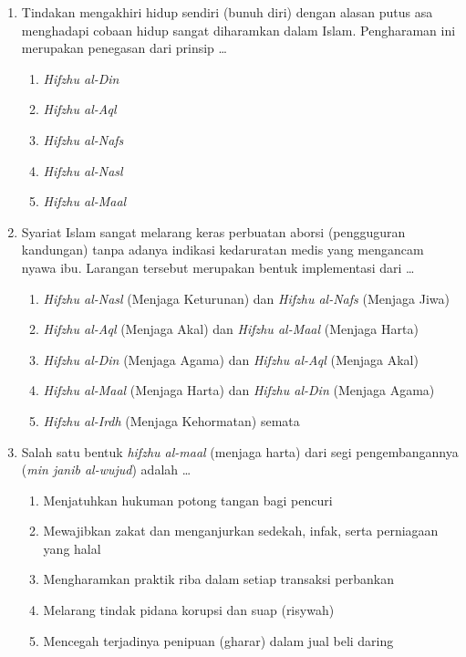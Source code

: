 \documentclass[12pt,a4paper]{article}
\begin{document}
\begin{enumerate}[leftmargin=*]
\item Tindakan mengakhiri hidup sendiri (bunuh diri) dengan alasan putus asa menghadapi cobaan hidup sangat diharamkan dalam Islam. Pengharaman ini merupakan penegasan dari prinsip \dots
    \begin{enumerate}[label=\alph*.]
        \item \textit{Hifzhu al-Din}
        \item \textit{Hifzhu al-Aql}
        \item \textit{Hifzhu al-Nafs}
        \item \textit{Hifzhu al-Nasl}
        \item \textit{Hifzhu al-Maal}
    \end{enumerate}

\item Syariat Islam sangat melarang keras perbuatan aborsi (pengguguran kandungan) tanpa adanya indikasi kedaruratan medis yang mengancam nyawa ibu. Larangan tersebut merupakan bentuk implementasi dari \dots
    \begin{enumerate}[label=\alph*.]
        \item \textit{Hifzhu al-Nasl} (Menjaga Keturunan) dan \textit{Hifzhu al-Nafs} (Menjaga Jiwa)
        \item \textit{Hifzhu al-Aql} (Menjaga Akal) dan \textit{Hifzhu al-Maal} (Menjaga Harta)
        \item \textit{Hifzhu al-Din} (Menjaga Agama) dan \textit{Hifzhu al-Aql} (Menjaga Akal)
        \item \textit{Hifzhu al-Maal} (Menjaga Harta) dan \textit{Hifzhu al-Din} (Menjaga Agama)
        \item \textit{Hifzhu al-Irdh} (Menjaga Kehormatan) semata
    \end{enumerate}

\item Salah satu bentuk \textit{hifzhu al-maal} (menjaga harta) dari segi pengembangannya (\textit{min janib al-wujud}) adalah \dots
    \begin{enumerate}[label=\alph*.]
        \item Menjatuhkan hukuman potong tangan bagi pencuri
        \item Mewajibkan zakat dan menganjurkan sedekah, infak, serta perniagaan yang halal
        \item Mengharamkan praktik riba dalam setiap transaksi perbankan
        \item Melarang tindak pidana korupsi dan suap (risywah)
        \item Mencegah terjadinya penipuan (gharar) dalam jual beli daring
    \end{enumerate}


\end{enumerate}
\end{document}
